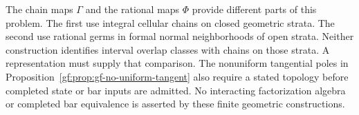 The chain maps \(\Gamma\) and the rational maps \(\Phi\)
provide different parts of this problem.  The first use integral
cellular chains on closed geometric strata.  The second use rational
germs in formal normal neighborhoods of open strata.
Neither construction identifies interval overlap classes with chains
on those strata.  A representation must supply that comparison.
The nonuniform tangential poles in
Proposition~\ref{gf:prop:gf-no-uniform-tangent} also require a stated
topology before completed state or bar inputs are admitted.
No interacting factorization algebra or completed bar equivalence
is asserted by these finite geometric constructions.
